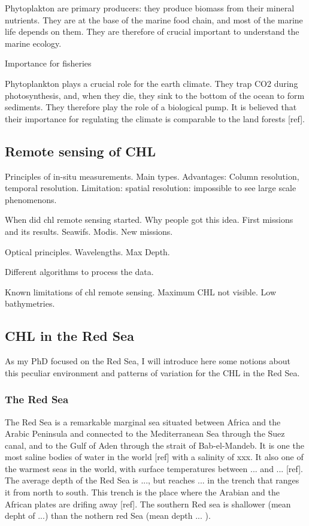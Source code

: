 		Phytoplakton are primary producers: they produce biomass from their mineral nutrients. They are at the base of the marine food chain, and most of the marine life depends on them. They are therefore of crucial important to understand the marine ecology. 

		Importance for fisheries

		Phytoplankton plays a crucial role for the earth climate. They trap CO2 during photosynthesis, and, when they die, they sink to the bottom of the ocean to form sediments. They therefore play the role of a biological pump. It is believed that their importance for regulating the climate is comparable to the land forests [ref].

	\subsection{Remote sensing of CHL}
	\label{intro:context:sensing}
		Principles of in-situ measurements. Main types. Advantages: Column resolution, temporal resolution. Limitation: spatial resolution: impossible to see large scale phenomenons. 

		When did chl remote sensing started. Why people got this idea. First missions and its results. Seawifs. Modis. New missions. 

		Optical principles. Wavelengths. Max Depth. 

		Different algorithms to process the data. 

		Known limitations of chl remote sensing. Maximum CHL not visible. Low bathymetries. 

	\subsection{CHL in the Red Sea}
	\label{intro:context:chlredsea}

		As my PhD focused on the Red Sea, I will introduce here some notions about this peculiar environment and patterns of variation for the CHL in the Red Sea. 

		\subsubsection{The Red Sea}

			The Red Sea is a remarkable marginal sea situated between Africa and the Arabic Peninsula and connected to the Mediterranean Sea through the Suez canal, and to the Gulf of Aden through the strait of Bab-el-Mandeb. It is one the most saline bodies of water in the world [ref] with a salinity of xxx. It also one of the warmest seas in the world, with surface temperatures between ... and ... [ref]. The average depth of the Red Sea is ..., but reaches ... in the trench that ranges it from north to south. This trench is the place where the Arabian and the African plates are drifing away [ref]. The southern Red sea is shallower (mean depht of ...) than the nothern red Sea (mean depth ... ).


